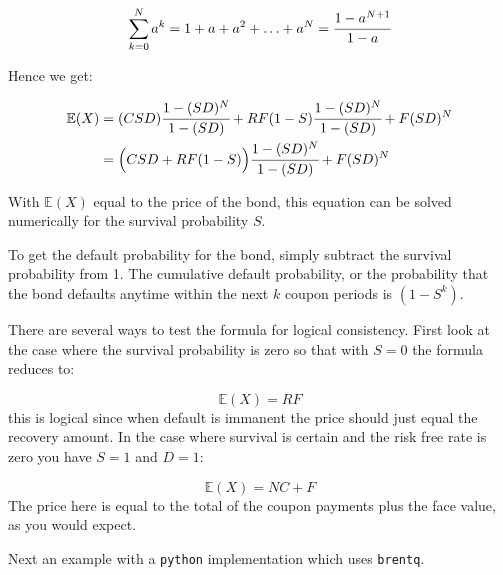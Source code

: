 \begin{equation}\sum_{k=0}^N a^k = 1 + a + a^2 + \ldots + a^N = \cfrac{1-a^{N+1}}{1-a} \end{equation}

Hence we get:

\begin{align}
\begin{split}
\mathbb{E}(X) &= (CSD) \cfrac{1-(SD)^N}{1-(SD)}+RF(1-S)\cfrac{1-(SD)^N}{1-(SD)} + F(SD)^N \\
&= \Big(CSD + RF(1-S)\Big)\cfrac{1-(SD)^N}{1-(SD)} + F(SD)^N 
\end{split}
\end{align}

With $\mathbb{E}(X)$ equal to the price of the bond, this equation can be solved numerically for the survival probability $S$.

To get the default probability for the bond, simply subtract the survival
probability from 1. The cumulative default probability, or the probability that the bond defaults anytime within the next $k$ coupon periods is $(1 - S^k)$.

There are several ways to test the formula for logical consistency. First look
at the case where the survival probability is zero so that with $S = 0$ the
formula reduces to:

\begin{equation}\mathbb{E}(X) = RF\end{equation}
this is logical since when default is immanent the price should just equal the
recovery amount.
In the case where survival is certain and the risk free rate is zero you have
$S = 1$ and $D=1$:

\begin{equation}\mathbb{E}(X) = NC + F \end{equation}
The price here is equal to the total of the coupon payments plus the face
value, as you would expect.

Next an example with a \texttt{python} implementation which uses \texttt{brentq}.


